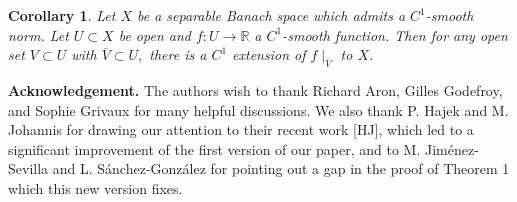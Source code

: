 \documentclass[11pt]{amsproc}%
\theoremstyle{plain}
\newtheorem{corollary}{Corollary}
\newtheorem{proposition}{Proposition}
\numberwithin{equation}{section}
\begin{document}
\begin{corollary}
Let $X$ be a separable Banach space which admits a $C^{1}$-smooth norm. Let
$U\subset X$ be open and $f:U\rightarrow\mathbb{R}$ a $C^{1}$-smooth function.
Then for any open set $V\subset U$ with $\overline{V}\subset U,$ there is a
$C^{1}$ extension of $f\mid_{\overline{V}}$ to $X$.
\end{corollary}



\medskip

\noindent\textbf{Acknowledgement.} The authors wish to thank
Richard Aron, Gilles Godefroy, and Sophie Grivaux for many helpful
discussions. We also thank P. Hajek and M. Johannis for drawing
our attention to their recent work [HJ], which led to a
significant improvement of the first version of our paper, and to
M. Jim{\'e}nez-Sevilla and L. S{\'a}nchez-Gonz{\'a}lez for pointing out a gap
in the proof of Theorem 1 which this new version fixes.
\end{document}
